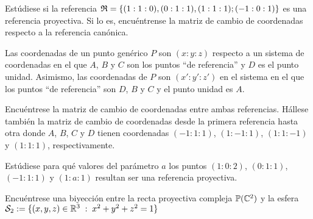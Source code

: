 \begin{prob}
	Estúdiese si la referencia $\mathfrak{R}=\{(1:1:0),(0:1:1),(1:1:1);(-1:0:1)\}$ es una referencia proyectiva. Si lo es, encuéntrense la matriz de cambio de coordenadas respecto a la referencia canónica.
\end{prob}
\begin{prob}
	Las coordenadas de un punto genérico $P$ son $(x:y:z)$ respecto a un sistema de coordenadas en el que $A$, $B$ y $C$ son los puntos ``de referencia'' y $D$ es el
	punto unidad. Asimismo, las coordenadas de $P$ son $(x':y':z')$ en el sistema en el que los puntos ``de referencia'' son $D$, $B$ y $C$ y el punto unidad es $A$.
	
	Encuéntrese la matriz de cambio de coordenadas entre ambas referencias. Hállese también la matriz de cambio de coordenadas desde la primera referencia hasta otra donde $A$, $B$, $C$ y $D$ tienen coordenadas $(-1:1:1)$, $(1:-1:1)$, $(1:1:-1)$ y $(1:1:1)$, respectivamente.
\end{prob}
\begin{prob}
	Estúdiese para qué valores del parámetro $a$ los puntos $(1:0:2)$, $(0:1:1)$, $(-1:1:1)$ y $(1:a:1)$ resultan ser una referencia proyectiva.
\end{prob}
\begin{prob}
	Encuéntrese una biyección entre la recta proyectiva compleja $\mathbb{P}(\mathbb{C}^2)$ y la esfera $\mathcal{S}_2:=\{(x,y,z)\in\mathbb{R}^3\;:\; x^2+y^2+z^2=1\}$
\end{prob}